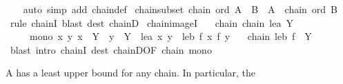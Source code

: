 \begin{isabellebody}
%
\isadelimproof
\ \ %
\endisadelimproof
%
\isatagproof
{}\isamarkupfalse%
\ {\isacharparenleft}{\kern0pt}auto\ simp\ add{\isacharcolon}{\kern0pt}\ chain{\isacharunderscore}{\kern0pt}def{\isacharparenright}{\kern0pt}%
\endisatagproof
{\isafoldproof}%
%
\isadelimproof
\isanewline
%
\endisadelimproof
\isanewline
{}\isamarkupfalse%
\ chain{\isacharunderscore}{\kern0pt}subset{\isacharcolon}{\kern0pt}\ {\isachardoublequoteopen}chain\ ord\ A\ {\isasymLongrightarrow}\ B\ {\isasymsubseteq}\ A\ {\isasymLongrightarrow}\ chain\ ord\ B{\isachardoublequoteclose}\isanewline
%
\isadelimproof
\ \ %
\endisadelimproof
%
\isatagproof
{}\isamarkupfalse%
\ {\isacharparenleft}{\kern0pt}rule\ chainI{\isacharparenright}{\kern0pt}\ {\isacharparenleft}{\kern0pt}blast\ dest{\isacharcolon}{\kern0pt}\ chainD{\isacharparenright}{\kern0pt}%
\endisatagproof
{\isafoldproof}%
%
\isadelimproof
\isanewline
%
\endisadelimproof
\isanewline
{}\isamarkupfalse%
\ chain{\isacharunderscore}{\kern0pt}imageI{\isacharcolon}{\kern0pt}\isanewline
\ \ \ chain{\isacharcolon}{\kern0pt}\ {\isachardoublequoteopen}chain\ le{\isacharunderscore}{\kern0pt}a\ Y{\isachardoublequoteclose}\isanewline
\ \ \ \ \ mono{\isacharcolon}{\kern0pt}\ {\isachardoublequoteopen}{\isasymAnd}x\ y{\isachardot}{\kern0pt}\ x\ {\isasymin}\ Y\ {\isasymLongrightarrow}\ y\ {\isasymin}\ Y\ {\isasymLongrightarrow}\ le{\isacharunderscore}{\kern0pt}a\ x\ y\ {\isasymLongrightarrow}\ le{\isacharunderscore}{\kern0pt}b\ {\isacharparenleft}{\kern0pt}f\ x{\isacharparenright}{\kern0pt}\ {\isacharparenleft}{\kern0pt}f\ y{\isacharparenright}{\kern0pt}{\isachardoublequoteclose}\isanewline
\ \ \ {\isachardoublequoteopen}chain\ le{\isacharunderscore}{\kern0pt}b\ {\isacharparenleft}{\kern0pt}f\ {\isacharbackquote}{\kern0pt}\ Y{\isacharparenright}{\kern0pt}{\isachardoublequoteclose}\isanewline
%
\isadelimproof
\ \ %
\endisadelimproof
%
\isatagproof
{}\isamarkupfalse%
\ {\isacharparenleft}{\kern0pt}blast\ intro{\isacharcolon}{\kern0pt}\ chainI\ dest{\isacharcolon}{\kern0pt}\ chainD{\isacharbrackleft}{\kern0pt}OF\ chain{\isacharbrackright}{\kern0pt}\ mono{\isacharparenright}{\kern0pt}%
\endisatagproof
{\isafoldproof}%
%
\isadelimproof
%
\endisadelimproof
%
\isadelimdocument
%
\endisadelimdocument
%
\isatagdocument
%
\isamarkuptrue%
%
\endisatagdocument
{\isafolddocument}%
%
\isadelimdocument
%
\endisadelimdocument
%
\begin{isamarkuptext}%
A  has a least upper bound for any chain.  In particular, the

\end{isamarkuptext}
\end{isabellebody}
